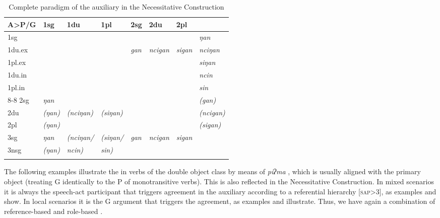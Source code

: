 \begin{table}[htp]
\begin{center}
\begin{tabular}{l|l|l|l|l|l|l|l}
\lsptoprule
{\bf A>P/G} 	&	{\sc 1sg}&	{\sc 1du}& {\sc 1pl} &{\sc 2sg}&{\sc 2du}&{\sc 2pl}&{\sc 3}\\
\hline
{\sc 1sg}  		&\multicolumn{3}{c|}{\cellcolor[gray]{.8}}	& &&				& \it ŋan  \\
{\sc  1du.ex}   &\multicolumn{3}{c|}{\cellcolor[gray]{.8}}	&\it gan&\it ncigan&\it sigan	& \it nciŋan\\
{\sc 1pl.ex}   	&\multicolumn{3}{c|}{\cellcolor[gray]{.8}}	& &&				& \it siŋan \\
\cline{5-7}
{\sc 1du.in}   	&\multicolumn{6}{c|}{\cellcolor[gray]{.8}}				& \it ncin  \\
{\sc 1pl.in}   	&\multicolumn{6}{c|}{\cellcolor[gray]{.8}}	 					& \it sin  \\
\cline{1-4}{8-8}
{\sc 2sg}  		& \it ŋan	& & &\multicolumn{3}{c|}{\cellcolor[gray]{.8}}	& \it (gan) \\
\cline{2-2}
{\sc 2du}  	& \it (ŋan)& \it (nciŋan) &  \it (siŋan)	&\multicolumn{3}{c|}{\cellcolor[gray]{.8}}&  \it (ncigan) \\
{\sc 2pl}  	& \it (ŋan) &  &	&\multicolumn{3}{c|}{\cellcolor[gray]{.8}}			&  \it (sigan) \\
\hline
{\sc 3sg}  	& \it ŋan	&  \it (nciŋan/&\it (siŋan/	 & \it gan&\it ncigan&\it  sigan&\cellcolor[gray]{.8}\\
\cline{2-2}
{\sc 3nsg}  &  \it (ŋan)&\it ncin)  & 	\it sin)				&&&			&\cellcolor[gray]{.8} \\
\lspbottomrule
\end{tabular}
\caption{Complete paradigm of the auxiliary in the Necessitative Construction}\label{cop-agree}
\end{center}
\end{table}


The following examples illustrate the  in verbs of the double object class by means of  \emph{piʔma} , which is usually aligned with the primary object (treating G identically to the P of monotransitive verbs). This is also reflected in the Necessitative Construction. In mixed scenarios  it is always the speech-act participant that triggers agreement in the auxiliary according to a referential hierarchy [\textsc{sap}>3], as examples \Next[a] and \Next[b] show. In local scenarios it is the G argument that triggers the agreement, as examples \Next[c] and \Next[d] illustrate. Thus, we have again a combination of reference-based and role-based . 
 
